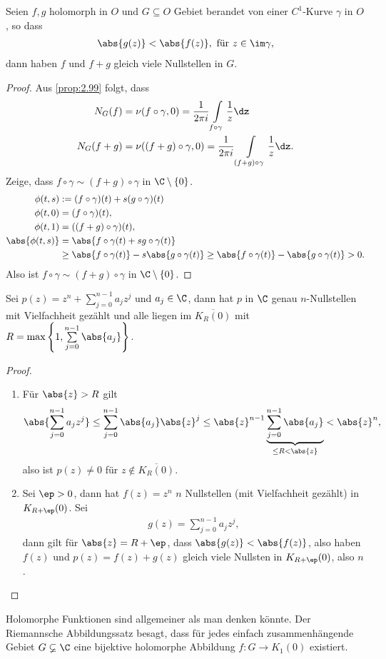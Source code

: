 \begin{prop}
\label{prop:2.100}
Seien $f,g$ holomorph in $O$ und $G\subseteq O$ Gebiet berandet von einer
$C^1$-Kurve $\gamma$ in $O$, so dass
\begin{align*}
\abs{g(z)}<\abs{f(z)}, \text{ für } z\in\im \gamma,
\end{align*}
dann haben $f$ und $f+g$ gleich viele Nullstellen in $G$.\fishhere
\end{prop}
\begin{proof}
Aus \ref{prop:2.99} folgt, dass
\begin{align*}N_G(f) &= \nu(f\circ\gamma,0) =
\frac{1}{2\pi i}\int\limits_{f\circ\gamma} \frac{1}{z}\dz\\
N_G(f+g) &= \nu((f+g)\circ\gamma,0) = \frac{1}{2\pi
i}\int\limits_{(f+g)\circ\gamma} \frac{1}{z}\dz.
\end{align*}
Zeige, dass $f\circ\gamma\sim (f+g)\circ \gamma$ in $\C\setminus\{0\}$.
\begin{align*}
\phi(t,s) &:= (f\circ\gamma)(t) + s(g\circ\gamma)(t)\\
\phi(t,0) &= (f\circ\gamma)(t),\\
\phi(t,1) &= ((f+g)\circ\gamma)(t),\\
\abs{\phi(t,s)} &= \abs{f\circ\gamma(t) + s g\circ\gamma(t)} \\ &\ge
\abs{f\circ\gamma(t)} - s\abs{g\circ\gamma(t)} \ge
\abs{f\circ\gamma(t)}-\abs{g\circ\gamma(t)} > 0.
\end{align*}
Also ist $f\circ\gamma \sim (f+g)\circ\gamma$ in $\C\setminus\{0\}$.\qedhere
\end{proof}

\begin{prop}
\label{prop:2.101}
Sei $p(z) = z^n + \sum\limits_{j=0}^{n-1} a_j z^j$ und $a_j\in\C$, dann hat $p$
in $\C$ genau $n$-Nullstellen mit Vielfachheit gezählt und alle liegen im
$\overline{K_R(0)}$ mit $R=\max\left\{
1,\sum\limits_{j=0}^{n-1}\abs{a_j}\right\}$.
\end{prop}
\begin{proof}
\begin{enumerate}[label=\arabic{*}.)]
\item Für $\abs{z} > R$ gilt
\begin{align*}
\abs{\sum\limits_{j=0}^{n-1} a_j z^j} \le \sum\limits_{j=0}^{n-1} \abs{a_j}
\abs{z}^j \le \abs{z}^{n-1}\underbrace{\sum\limits_{j=0}^{n-1} \abs{a_j}}_{\le
R < \abs{z}} < \abs{z}^n,
\end{align*}
also ist $p(z)\neq 0$ für $z\notin\overline{K_R(0)}$.
\item
Sei $\ep > 0$, dann hat $f(z) = z^n$ $n$ Nullstellen (mit
Vielfachheit gezählt) in $K_{R+\ep}(0)$. Sei
\begin{align*}
g(z) =\sum\limits_{j=0}^{n-1} a_j z^j,
\end{align*}
dann gilt für $\abs{z} = R+\ep$, dass $\abs{g(z)}<\abs{f(z)}$, also haben $f(z)$
und $p(z) = f(z)+g(z)$ gleich viele Nullsten in $K_{R+\ep}(0)$, also
$n$.\qedhere
\end{enumerate}
\end{proof}

\begin{bem}
\label{bem:2.102}
Holomorphe Funktionen sind allgemeiner als man denken könnte. Der Riemannsche
Abbildungssatz besagt, dass für jedes einfach zusammenhängende Gebiet
$G\varsubsetneq  \C$ eine bijektive holomorphe Abbildung $f:G\to K_1(0)$
existiert.\maphere
\end{bem}